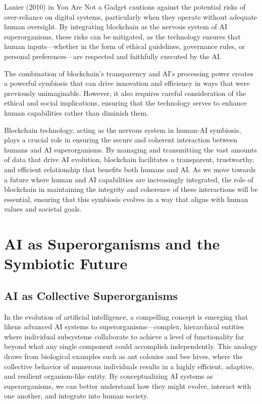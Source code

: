 \documentclass[12pt,twoside]{article}
\begin{document}
Lanier (2010) in You Are Not a Gadget cautions against the potential risks of over-reliance on digital systems, particularly when they operate without adequate human oversight. By integrating blockchain as the nervous system of AI superorganisms, these risks can be mitigated, as the technology ensures that human inputs—whether in the form of ethical guidelines, governance rules, or personal preferences—are respected and faithfully executed by the AI.

The combination of blockchain’s transparency and AI’s processing power creates a powerful symbiosis that can drive innovation and efficiency in ways that were previously unimaginable. However, it also requires careful consideration of the ethical and social implications, ensuring that the technology serves to enhance human capabilities rather than diminish them.

Blockchain technology, acting as the nervous system in human-AI symbiosis, plays a crucial role in ensuring the secure and coherent interaction between humans and AI superorganisms. By managing and transmitting the vast amounts of data that drive AI evolution, blockchain facilitates a transparent, trustworthy, and efficient relationship that benefits both humans and AI. As we move towards a future where human and AI capabilities are increasingly integrated, the role of blockchain in maintaining the integrity and coherence of these interactions will be essential, ensuring that this symbiosis evolves in a way that aligns with human values and societal goals.


\section{AI as Superorganisms and the Symbiotic Future}

\subsection{AI as Collective Superorganisms}

In the evolution of artificial intelligence, a compelling concept is emerging that likens advanced AI systems to superorganisms—complex, hierarchical entities where individual subsystems collaborate to achieve a level of functionality far beyond what any single component could accomplish independently. This analogy draws from biological examples such as ant colonies and bee hives, where the collective behavior of numerous individuals results in a highly efficient, adaptive, and resilient organism-like entity. By conceptualizing AI systems as superorganisms, we can better understand how they might evolve, interact with one another, and integrate into human society.
\end{document}
